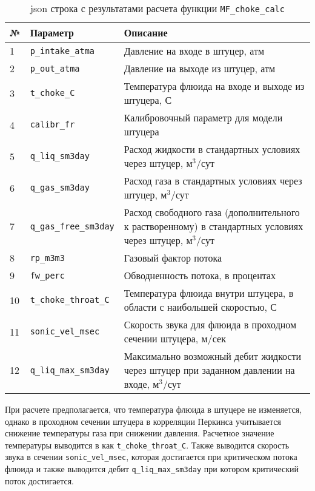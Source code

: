 \begin{table}[H]
	\caption{json строка с результатами расчета функции \texttt{MF_choke_calc} }
	\label{table:param_list_choke_calc}
	\begin{tabular}{p{}p{}p{}}
		\hline
		№& Параметр & Описание  \\ \hline
		
		1 & \texttt{p_intake_atma} & Давление на входе в штуцер, атм    \\ \hline
		2 & \texttt{p_out_atma} & Давление на выходе из штуцер, атм    \\ \hline
		3 & \texttt{t_choke_C} & Температура флюида на входе и выходе из штуцера, С  \\ \hline
		4 & \texttt{calibr_fr} & Калибровочный параметр для модели штуцера  \\ \hline
		5 & \texttt{q_liq_sm3day} & Расход жидкости в стандартных условиях через штуцер, м$^3$/сут    \\ \hline
		6 & \texttt{q_gas_sm3day} & Расход газа в стандартных условиях через штуцер, м$^3$/сут    \\ \hline
		7 & \texttt{q_gas_free_sm3day} & Расход свободного газа (дополнительного к растворенному) в стандартных условиях через штуцер, м$^3$/сут    \\ \hline
		8 & \texttt{rp_m3m3} &  Газовый фактор потока  \\ \hline
		9 & \texttt{fw_perc} &  Обводненность потока, в процентах \\ \hline
		10 & \texttt{t_choke_throat_C} & Температура флюида внутри штуцера, в области с наибольшей скоростью, С  \\ \hline
		11 & \texttt{sonic_vel_msec} & Скорость звука для флюида в проходном сечении штуцера, м/сек  \\ \hline
		12 & \texttt{q_liq_max_sm3day} & Максимально возможный дебит жидкости через штуцер при заданном давлении на входе, м$^3$/сут  \\ \hline
		
	\end{tabular}
\end{table}
 
 При расчете предполагается, что температура флюида в штуцере не изменяется, однако в проходном сечении штуцера в корреляции Перкинса учитывается снижение температуры газа при снижении давления. Расчетное значение температуры выводится в как  \texttt{t_choke_throat_C}. Также выводится скорость звука в сечении \texttt{sonic_vel_msec}, которая достигается при критическом потока флюида и также выводится дебит \texttt{q_liq_max_sm3day} при котором критический поток достигается. 
 
